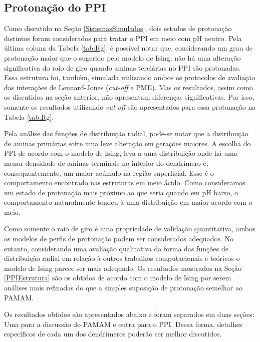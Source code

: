 \subsection{Protonação do PPI}\label{ProtonacaoPPI}

Como discutido na Seção \ref{SistemasSimulados}, dois estados de protonação distintos foram considerados para tratar o PPI em meio com pH neutro. 
Pela última coluna da Tabela \ref{tab:Rg}, é possível notar que, considerando um grau de protonação maior que o sugerido pelo modelo de Ising\cite{VanDuijvenbode1998, Koper1997}, não há uma alteração significativa do raio de giro quando aminas terciárias no PPI são protonadas.
Essa estrutura foi, também, simulada utilizando ambos os protocolos de avaliação das interações de Lennard-Jones (\textit{cut-off} e PME).
Mas os resultados, assim como os discutidos na seção anterior, não apresentam diferenças significativas.
Por isso, somente os resultados utilizando \textit{cut-off} são apresentados para essa protonação na Tabela \ref{tab:Rg}.

Pela análise das funções de distribuição radial, pode-se notar que a distribuição de aminas primárias sofre uma leve alteração em gerações maiores.
A escolha do PPI de acordo com o modelo de Ising\cite{VanDuijvenbode1998, Koper1997}, leva a uma distribuição onde há uma menor densidade de aminas terminais no interior do dendrímero e, consequentemente, um maior acúmulo na região superficial.
Esse é o comportamento encontrado nas estruturas em meio ácido.
Como consideramos um estado de protonação mais próximo ao que seria quando em pH baixo, o comportamento naturalmente tendeu à uma distribuição em maior acordo com o meio.

Como somente o raio de giro é uma propriedade de validação quantitativa, ambos os modelos de perfis de protonação podem ser considerados adequados.
No entanto, considerando uma avaliação qualitativa da forma das funções de distribuição radial em relação à outros trabalhos computacionais e teóricos o modelo de Ising\cite{VanDuijvenbode1998, Koper1997} parece ser mais adequado. Os resultados mostrados na Seção \ref{PPIEstrutura} são os obtidos de acordo com o modelo de Ising\cite{VanDuijvenbode1998, Koper1997} por serem análises mais refinadas do que a simples suposição de protonação semelhar ao PAMAM.

Os resultados obtidos são apresentados abaixo e foram separados em duas seções: Uma para a discussão do PAMAM e outra para o PPI. Dessa forma, detalhes específicos de cada um dos dendrímeros poderão ser melhor discutidos.

